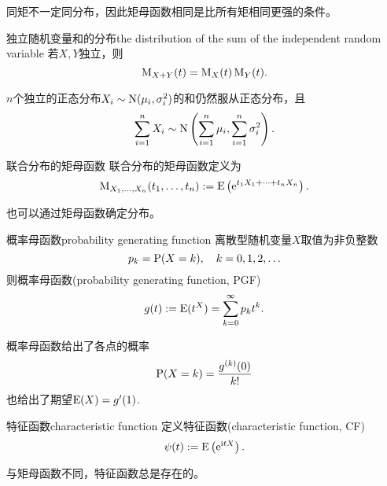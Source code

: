 \begin{corollary}
	同矩不一定同分布，因此矩母函数相同是比所有矩相同更强的条件。
\end{corollary}
\begin{theorem}{独立随机变量和的分布}{the distribution of the sum of the independent random variable}
	若$X,Y$独立，则
	\[
		\MGF_{X+Y}(t)=\MGF_X(t)\MGF_Y(t).
	\]
\end{theorem}
\begin{corollary}
	$n$个独立的正态分布$X_i\sim\Norm(\mu_i,\sigma_i^2)$的和仍然服从正态分布，且
	\[
		\sum_{i=1}^nX_i\sim\Norm\kh{\sum_{i=1}^n\mu_i,\sum_{i=1}^n\sigma_i^2}.
	\]
\end{corollary}
\begin{definition}{联合分布的矩母函数}{}
	联合分布的矩母函数定义为
	\begin{equation}
		\MGF_{X_1,\ldots,X_n}(t_1,\ldots,t_n):=\E\kh{\e{t_1X_1+\cdots+t_nX_n}}.
	\end{equation}
\end{definition}
也可以通过矩母函数确定分布。
\begin{definition}{概率母函数}{probability generating function}
	离散型随机变量$X$取值为非负整数
	\[
		p_k=\P(X=k),\quad k=0,1,2,\ldots
	\]
	则概率母函数(probability generating function, PGF)
	\[
		g(t):=\E(t^X)=\sum_{k=0}^\infty p_kt^k.
	\]
\end{definition}
概率母函数给出了各点的概率
\[
	\P(X=k)=\frac{g^{(k)}(0)}{k!}
\]
也给出了期望$\E(X)=g'(1)$.
\begin{definition}{特征函数}{characteristic function}
	定义特征函数(characteristic function, CF)
	\begin{equation}\label{CF-def}
		\psi(t):=\E\kh{\e{\i tX}}.
	\end{equation}
\end{definition}
与矩母函数不同，特征函数总是存在的。
